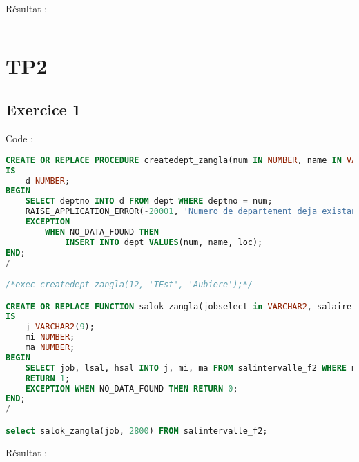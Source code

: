 \documentclass{article}
\begin{document}
Résultat :
\begin{lstlisting}[language=SQL,
    morekeywords={DECLARE, LOOP, TYPE, FOR, IF, IS, OPEN, FETCH, DBMS_OUTPUT, PUT_LINE}]
\end{lstlisting}

\newpage
\section{TP2}
\subsection{Exercice 1}
Code :
\begin{lstlisting}[language=SQL,
    deletekeywords={char},
    morekeywords={DECLARE, LOOP, TYPE, FOR, IF, IS, OPEN, FETCH, DBMS_OUTPUT, PUT_LINE}]
CREATE OR REPLACE PROCEDURE createdept_zangla(num IN NUMBER, name IN VARCHAR2, loc IN VARCHAR2)
IS
    d NUMBER;
BEGIN
    SELECT deptno INTO d FROM dept WHERE deptno = num;
    RAISE_APPLICATION_ERROR(-20001, 'Numero de departement deja existant');
    EXCEPTION 
        WHEN NO_DATA_FOUND THEN
            INSERT INTO dept VALUES(num, name, loc);
END;
/

/*exec createdept_zangla(12, 'TEst', 'Aubiere');*/

CREATE OR REPLACE FUNCTION salok_zangla(jobselect in VARCHAR2, salaire in NUMBER) RETURN NUMBER 
IS
    j VARCHAR2(9);
    mi NUMBER;
    ma NUMBER;
BEGIN
    SELECT job, lsal, hsal INTO j, mi, ma FROM salintervalle_f2 WHERE mi <= salaire AND ma >= salaire;
    RETURN 1; 
    EXCEPTION WHEN NO_DATA_FOUND THEN RETURN 0;
END;
/

select salok_zangla(job, 2800) FROM salintervalle_f2;
\end{lstlisting}

Résultat :
\begin{lstlisting}[language=SQL,
    morekeywords={DECLARE, LOOP, TYPE, FOR, IF, IS, OPEN, FETCH, DBMS_OUTPUT, PUT_LINE}]
\end{lstlisting}
\end{document}
